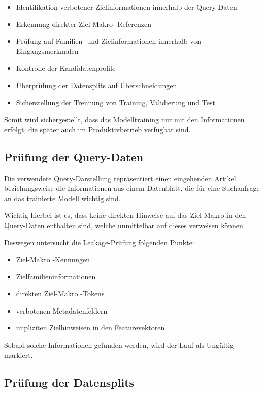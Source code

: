 \begin{itemize} 
\item Identifikation verbotener Zielinformationen innerhalb der Query-Daten 
\item Erkennung direkter Ziel-Makro \parencite{EPLAN-Makros} -Referenzen 
\item Prüfung auf Familien- und Zielinformationen innerhalb von Eingangsmerkmalen 
\item Kontrolle der Kandidatenprofile 
\item Überprüfung der Datensplits auf Überschneidungen 
\item Sicherstellung der Trennung von Training, Validierung und Test 
\end{itemize}

Somit wird sichergestellt, dass das Modelltraining nur mit den Informationen erfolgt, die später auch im Produktivbetrieb verfügbar sind.

\subsection{Prüfung der Query-Daten}

Die verwendete Query-Darstellung repräsentiert einen eingehenden Artikel \parencite{EPLANArtikelverwaltung} beziehungsweise die Informationen aus einem Datenblatt, die für eine Suchanfrage an das trainierte Modell wichtig sind.

Wichtig hierbei ist es, dass keine direkten Hinweise auf das Ziel-Makro \parencite{EPLAN-Makros} in den Query-Daten enthalten sind, welche unmittelbar auf dieses verweisen können.

Deswegen untersucht die Leakage-Prüfung folgenden Punkte:

\begin{itemize} 
  \item Ziel-Makro \parencite{EPLAN-Makros} -Kennungen 
  \item Zielfamilieninformationen 
  \item direkten Ziel-Makro \parencite{EPLAN-Makros} -Tokens 
  \item verbotenen Metadatenfeldern 
  \item impliziten Zielhinweisen in den Featurevektoren 
\end{itemize}

Sobald solche Informationen gefunden werden, wird der Lauf als Ungültig markiert.

\subsection{Prüfung der Datensplits}

